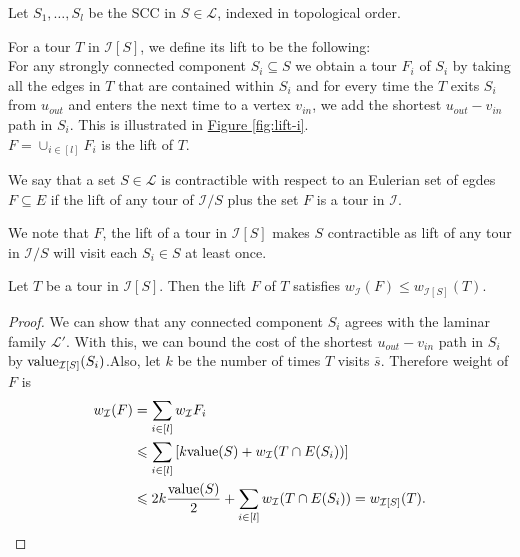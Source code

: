 \documentclass[./main.tex]{subfiles}
\newcommand{\calI}{\ensuremath{\mathcal{I}}}
\newcommand{\calL}{\ensuremath{\mathcal{L}}}
\begin{document}
	Let $S_1, \dots, S_l$ be the SCC in $S \in \calL$, indexed in topological order.
	\begin{definition}\label{def:3:indu-lift}
		For a tour $T$ in $\calI[S]$, we define its lift to be the following:\\
		For any strongly connected component $S_i \subseteq S$ we obtain a tour $F_i$ of $S_i$ by taking all the edges in $T$ that are contained within $S_i$ and for every time the $T$ exits $S_i$ from $u_{out}$ and enters the next time to a vertex $v_{in}$, we add the shortest $u_{out} - v_{in}$ path in $S_i$. 
		This is illustrated in \hyperref[fig:lift-i]{Figure \ref{fig:lift-i}}.\\
		$F = \cup_{i \in [l]} F_i$ is the lift of $T$.
	\end{definition}\vspace{2mm}
	
	\begin{definition}
		We say that a set $S \in \calL$ is contractible with respect to an Eulerian set of egdes $F \subseteq E$ if the lift of any tour of $\calI/S$ plus the set $F$ is a tour in $\calI$.
	\end{definition}\vspace{2mm}
	We note that $F$, the lift of a tour in $\calI[S]$ makes $S$ contractible as lift of any tour in $\calI/S$ will visit each $S_i \in S$ at least once.
		
	\begin{lemma}\label{lemm:3:lift-i}
		Let $T$ be a tour in $\calI[S]$. Then the lift $F$ of $T$ satisfies $w_\calI(F) \leqslant w_{\calI[S]}(T).$
	\end{lemma}
	\begin{proof}
		We can show that any connected component $S_i$ agrees with the laminar family $\calL'$. With this, we can bound the cost of the shortest $u_{out} - v_{in}$ path in $S_i$ by $\val_{\calI[S]}(S_i)$.Also, let $k$ be the number of times $T$ visits $\bar{s}$. Therefore weight of $F$ is
		\begin{align*}
			w_{\calI}(F) &= \sum_{i \in [l]} w_{\calI}F_i\\
			&\leqslant \sum_{i \in [l]} \left[k\val(S) + w_{\calI}(T \cap E(S_i))\right]\\
			&\leqslant 2k \frac{\val(S)}{2} + \sum_{i \in [l]}w_{\calI}(T \cap E(S_i)) = w_{\calI[S]}(T).
		\end{align*}
	\end{proof}
\end{document}
